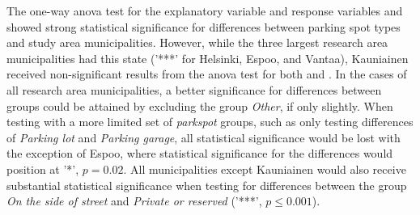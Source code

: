 The one-way \acrshort{anova} test for the explanatory variable  and response variables  and  showed strong statistical significance for differences between parking spot types and study area municipalities. However, while the three largest research area municipalities had this state ('***' for Helsinki, Espoo, and Vantaa), Kauniainen received non-significant results from the \acrshort{anova} test for both  and . In the cases of all research area municipalities, a better significance for differences between  groups could be attained by excluding the group \textit{Other}, if only slightly. When testing with a more limited set of \textit{parkspot} groups, such as only testing differences of \textit{Parking lot} and \textit{Parking garage}, all statistical significance would be lost with the exception of Espoo, where statistical significance for the differences would position at '*', $p = 0.02$. All municipalities except Kauniainen would also receive substantial statistical significance when testing for differences between the group \textit{On the side of street} and \textit{Private or reserved} ('***', $p \leq 0.001$).


